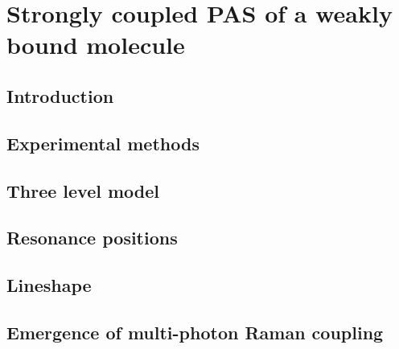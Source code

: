 \chapter{Strongly coupled PAS of a weakly bound molecule}
\label{ch:chap5}

\section{Introduction}
\label{sec:highE_intro}

\section{Experimental methods}
\label{sec:highE_methods}

\section{Three level model}
\label{sec:highE_3level}

\section{Resonance positions}
\label{sec:highE_lossPeaks}

\section{Lineshape}
\label{sec:highE_lines}

\section{Emergence of multi-photon Raman coupling}
\label{sec:highE_coupling}